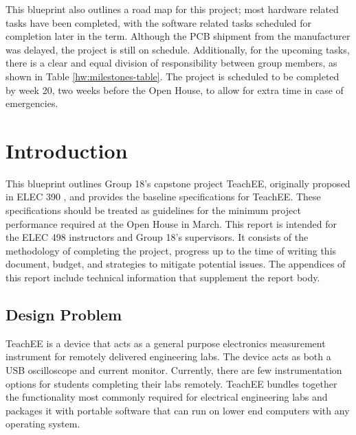 \documentclass[letterpaper,12pt]{article}
\begin{document}
This blueprint also outlines a road map for this project; most hardware related tasks have
been completed, with the software related tasks scheduled for completion later
in the term. Although the PCB shipment from the manufacturer was delayed, the
project is still on schedule. Additionally, for the upcoming tasks, there is a
clear and equal division of responsibility between group members, as shown in
Table \ref{hw:milestones-table}. The project is scheduled to be completed by
week 20, two weeks before the Open House, to allow for extra time in case of
emergencies.
\newpage

\tableofcontents
\listoffigures
\listoftables
\newpage
{}
\section{Introduction} \label{sec:intro} %
This blueprint outlines Group 18's capstone project TeachEE,
originally proposed in ELEC 390 \cite{prop_390}, and provides the baseline
specifications for TeachEE. These specifications should be treated as guidelines
for the minimum project performance required at the Open House in March. This
report is intended for the ELEC 498 instructors and Group 18's supervisors. It
consists of the methodology of completing the project, progress up to
the time of writing this document, budget, and strategies to mitigate potential
issues. The appendices of this report include technical information that
supplement the report body.

\subsection{Design Problem}
TeachEE is a device that acts as a general purpose electronics measurement
instrument for remotely delivered engineering labs. The device acts as both a
USB oscilloscope and current monitor. Currently, there are few instrumentation
options for students completing their labs remotely. TeachEE bundles
together the functionality most commonly required for electrical engineering
labs and packages it with portable software that can run on lower end computers
with any operating system.
\end{document}
